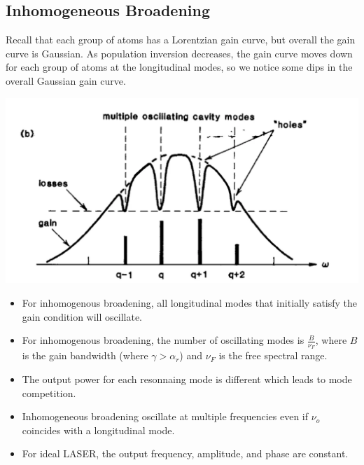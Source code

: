 \documentclass[11pt]{article}
\begin{document}
\subsection{Inhomogeneous Broadening}
Recall that each group of atoms has a Lorentzian gain curve, but overall the gain curve is Gaussian. As population inversion decreases, the gain curve moves down for each group of atoms at the longitudinal modes, so we notice some dips in the overall Gaussian gain curve. 
\begin{center}
    \includegraphics[scale=0.5]{4.png}
\end{center}
\begin{itemize}
    \item For inhomogenous broadening, all longitudinal modes that initially satisfy the gain condition will oscillate.
    \item For inhomogenous broadening, the number of oscillating modes is $\frac{B}{\nu_F}$, where $B$ is the gain bandwidth (where $\gamma > \alpha_r$) and $\nu_F$ is the free spectral range.
    \item The output power for each resonnaing mode is different which leads to mode competition.
    \item Inhomogeneous broadening oscillate at multiple frequencies even if $\nu_o$ coincides with a longitudinal mode.
    \item For ideal LASER, the output frequency, amplitude, and phase are constant.
\end{itemize}
\end{document}
